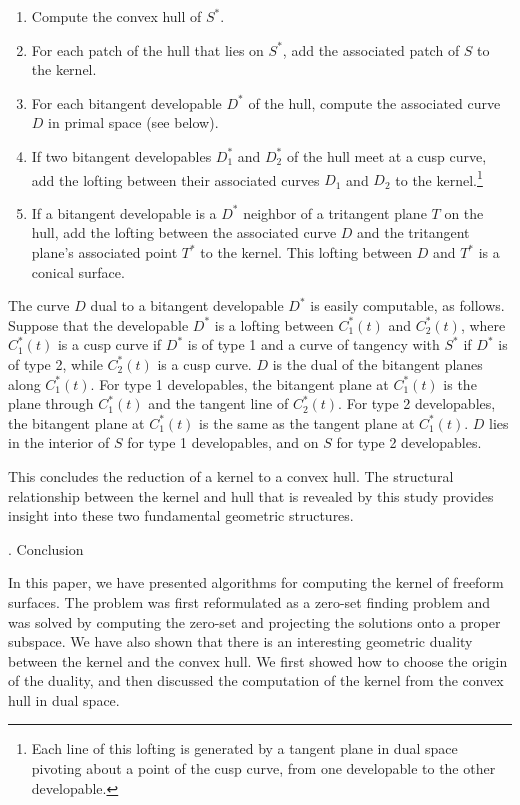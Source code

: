\documentclass[twoside]{article}
\newcounter{sectionc}\newcounter{subsectionc}\newcounter{subsubsectionc}
\renewcommand{\section}[1] {\vspace{12pt}\addtocounter{sectionc}{1} 
\setcounter{subsectionc}{0}\setcounter{subsubsectionc}{0}\noindent 
	{\tenbf\thesectionc. #1}\par\vspace{5pt}}
\begin{document}
\begin{enumerate}
\item Compute the convex hull of $S^*$.
\item For each patch of the hull that lies on $S^*$, add the associated patch of $S$
	to the kernel.
\item For each bitangent developable $D^*$ of the hull, compute the associated curve $D$ in primal space
  (see below).
\item If two bitangent developables $D_1^*$ and $D_2^*$ of the hull meet at a cusp curve, 
  add the lofting between their associated curves $D_1$ and $D_2$ to the kernel.\footnote{
    Each line of this lofting is generated by a tangent plane in dual space pivoting 
    about a point of the cusp curve, from one developable to the other developable.}
\item If a bitangent developable is a $D^*$ neighbor of a tritangent plane $T$ on the hull,
add the lofting between the associated curve $D$ and the tritangent plane's
associated point $T^*$ to the kernel.  This lofting between $D$ and 
$T^*$ is a conical surface.
\end{enumerate}

The curve $D$ dual to a bitangent developable $D^*$ is easily
computable, as follows.
Suppose that the developable $D^*$ is a lofting between $C^*_1(t)$ and $C^*_2(t)$,
where $C^*_1(t)$ is a cusp curve if $D^*$ is of type 1 and
a curve of tangency with $S^*$ if $D^*$ is of type 2,
while $C^*_2(t)$ is a cusp curve.
$D$ is the dual of the bitangent planes along $C^*_1(t)$.
For type 1 developables, the bitangent plane at $C^*_1(t)$ is the plane through
$C^*_1(t)$ and the tangent line of $C^*_2(t)$.
For type 2 developables, the bitangent plane at $C^*_1(t)$ is the same as the tangent plane
at $C^*_1(t)$.
$D$ lies in the interior of $S$ for type 1 developables,
and on $S$ for type 2 developables.

This concludes the reduction of a kernel to a convex hull.
The structural relationship between the kernel and hull that is revealed
by this study provides insight into these two fundamental geometric structures.

\section{Conclusion}
\label{sec-conclusion}
\noindent
In this paper, we have presented algorithms for computing
the kernel of freeform surfaces.
The problem was first reformulated as a zero-set finding problem
and was solved by computing the zero-set and
projecting the solutions onto a proper subspace.
We have also shown that there is an interesting geometric duality
between the kernel and the convex hull.
We first showed how to choose the origin of the duality, 
and then discussed the computation of the kernel from the convex hull
in dual space.
\end{document}

